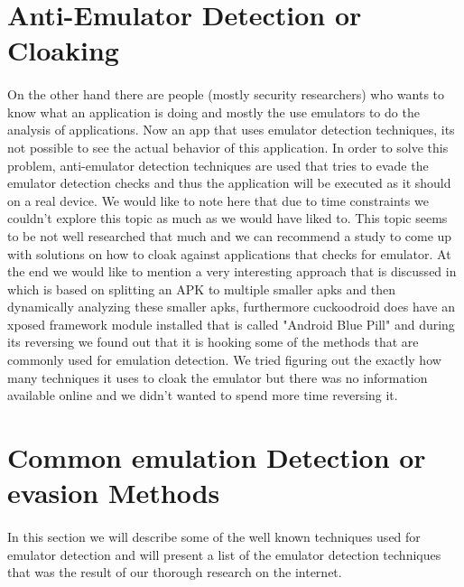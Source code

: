 \documentclass[../main.tex]{subfile}
\begin{document}
	\section{Anti-Emulator Detection or Cloaking}\label{sec::anti_emu_detection}
	\paragraph{} On the other hand there are people (mostly security researchers) who wants to know what an application is doing and mostly the use emulators to do the analysis of applications. Now an app that uses emulator detection techniques, its not possible to see the actual behavior of this application. In order to solve this problem, anti-emulator detection techniques are used that tries to evade the emulator detection checks and thus the application will be executed as it should on a real device. We would like to note here that due to time constraints we couldn't explore this topic as much as we would have liked to. This topic seems to be not well researched that much and we can recommend a study to come up with solutions on how to cloak against applications that checks for emulator. At the end we would like to mention a very interesting approach that is discussed in \cite{rasthofer2016harvesting} which is based on splitting an APK to multiple smaller apks and then dynamically analyzing these smaller apks, furthermore cuckoodroid does have an xposed framework module installed that is called "Android Blue Pill" and during its reversing we found out that it is hooking some of the methods that are commonly used for emulation detection. We tried figuring out the exactly how many techniques it uses to cloak the emulator but there was no information available online and we didn't wanted to spend more time reversing it.
	
	\section{Common emulation Detection or evasion Methods}\label{sec::common_methods_detection}
	\paragraph{} In this section we will describe some of the well known techniques used for emulator detection and will present a list of the emulator detection techniques that was the result of our thorough research on the internet.
\end{document}
